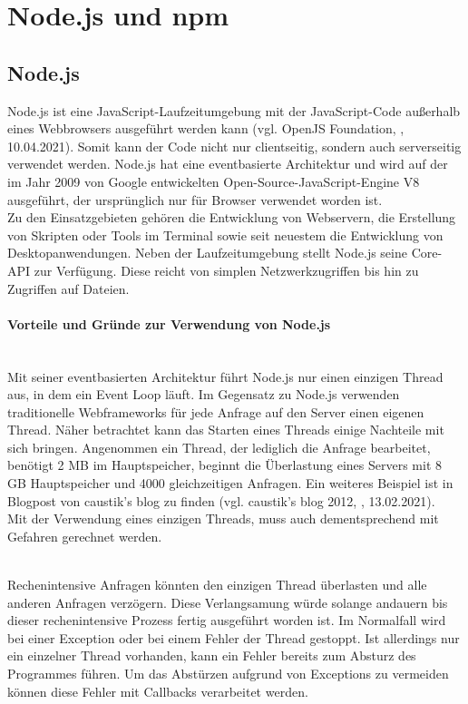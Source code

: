\section{Node.js und npm}

\subsection{Node.js}
Node.js ist eine JavaScript-Laufzeitumgebung mit der JavaScript-Code außerhalb eines Webbrowsers ausgeführt werden kann (vgl. OpenJS Foundation, \cite{nodejs_2021}, 10.04.2021). Somit kann der Code nicht nur clientseitig, sondern auch serverseitig verwendet werden. Node.js hat eine eventbasierte Architektur und wird auf der im Jahr 2009 von Google entwickelten Open-Source-JavaScript-Engine V8 ausgeführt, der ursprünglich nur für Browser verwendet worden ist.\\
Zu den Einsatzgebieten gehören die Entwicklung von Webservern, die Erstellung von Skripten oder Tools im Terminal sowie seit neuestem die Entwicklung von Desktopanwendungen. Neben der Laufzeitumgebung stellt Node.js seine Core-API zur Verfügung. Diese reicht von simplen Netzwerkzugriffen bis hin zu Zugriffen auf Dateien.

\paragraph{Vorteile und Gründe zur Verwendung von Node.js}
\mbox{}\\
Mit seiner eventbasierten Architektur führt Node.js nur einen einzigen Thread aus, in dem ein Event Loop läuft. Im Gegensatz zu Node.js verwenden traditionelle Webframeworks für jede Anfrage auf den Server einen eigenen Thread. Näher betrachtet kann das Starten eines Threads einige Nachteile mit sich bringen. Angenommen ein Thread, der lediglich die Anfrage bearbeitet, benötigt 2 MB im Hauptspeicher, beginnt die Überlastung eines Servers mit 8 GB Hauptspeicher und 4000 gleichzeitigen Anfragen. Ein weiteres Beispiel ist in Blogpost von caustik's blog zu finden (vgl. caustik's blog 2012, \cite{nodejs_blogpost_2012}, 13.02.2021).\\
Mit der Verwendung eines einzigen Threads, muss auch dementsprechend mit Gefahren gerechnet werden.

\mbox{}\\
Rechenintensive Anfragen könnten den einzigen Thread überlasten und alle anderen Anfragen verzögern. Diese Verlangsamung würde solange andauern bis dieser rechenintensive Prozess fertig ausgeführt worden ist. Im Normalfall wird bei einer Exception oder bei einem Fehler der Thread gestoppt. Ist allerdings nur ein einzelner Thread vorhanden, kann ein Fehler bereits zum Absturz des Programmes führen. Um das Abstürzen aufgrund von Exceptions zu vermeiden können diese Fehler mit Callbacks verarbeitet werden.

